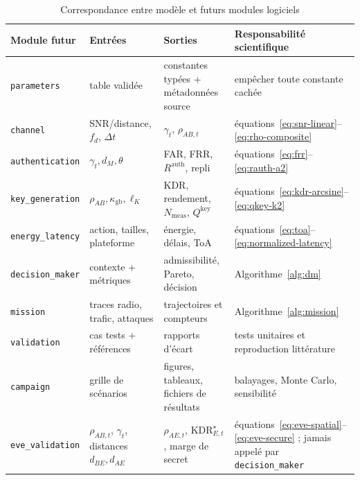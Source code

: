 \documentclass[conference,a4paper]{IEEEtran}
\newcommand{\Rauth}{R^{\mathrm{auth}}}
\newcommand{\Rkey}{Q^{\mathrm{key}}}
\newcommand{\KDR}{\mathrm{KDR}}
\begin{document}
\begin{table}[H]
\caption{Correspondance entre modèle et futurs modules logiciels}
\label{tab:implementation-map}
\centering\footnotesize
\begin{tabularx}{\textwidth}{@{}l Y Y Y@{}}
\toprule
Module futur & Entrées & Sorties & Responsabilité scientifique \\
\midrule
\texttt{parameters} & table validée & constantes typées + métadonnées source & empêcher toute constante cachée \\
\texttt{channel} & SNR/distance, $f_d$, $\Delta t$ & $\gamma_t$, $\rho_{AB,t}$ & équations~\eqref{eq:snr-linear}--\eqref{eq:rho-composite} \\
\texttt{authentication} & $\gamma_t,d_M,\theta$ & FAR, FRR, $\Rauth$, repli & équations~\eqref{eq:frr}--\eqref{eq:rauth-a2} \\
\texttt{key\_generation} & $\rho_{AB},\kappa_{\mathrm{gb}},\ell_K$ & KDR, rendement, $N_{\mathrm{meas}}$, $\Rkey$ & équations~\eqref{eq:kdr-arcsine}--\eqref{eq:qkey-k2} \\
\texttt{energy\_latency} & action, tailles, plateforme & énergie, délais, ToA & équations~\eqref{eq:toa}--\eqref{eq:normalized-latency} \\
\texttt{decision\_maker} & contexte + métriques & admissibilité, Pareto, décision & Algorithme~\ref{alg:dm} \\
\texttt{mission} & traces radio, trafic, attaques & trajectoires et compteurs & Algorithme~\ref{alg:mission} \\
\texttt{validation} & cas tests + références & rapports d'écart & tests unitaires et reproduction littérature \\
\texttt{campaign} & grille de scénarios & figures, tableaux, fichiers de résultats & balayages, Monte Carlo, sensibilité \\
\texttt{eve\_validation} & $\rho_{AB,t}$, $\gamma_t$, distances $d_{BE},d_{AE}$ & $\rho_{AE,t}$, $\KDR_{E,t}^\star$, marge de secret & équations~\eqref{eq:eve-spatial}--\eqref{eq:eve-secure} ; jamais appelé par \texttt{decision\_maker} \\
\bottomrule
\end{tabularx}
\end{table}
\end{document}
